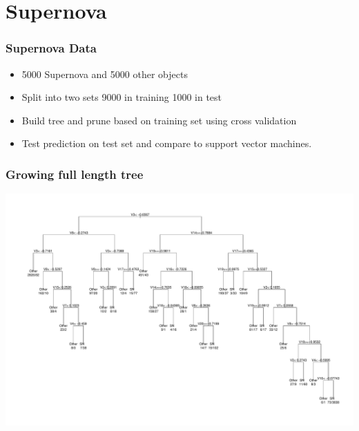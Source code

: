 \documentclass{beamer}
\begin{document}
\section{Supernova}
\begin{frame}
	\frametitle{Supernova Data}
	\begin{itemize}
		\item 5000 Supernova and 5000 other objects
		\item Split into two sets 9000 in training 1000 in test
		\item Build tree and prune based on training set using cross validation
		\item Test prediction on test set and compare to support vector machines.
	\end{itemize}
\end{frame}


\begin{frame}
\frametitle{Growing full length tree}
\includegraphics{full.pdf}
\end{frame}
\end{document}
